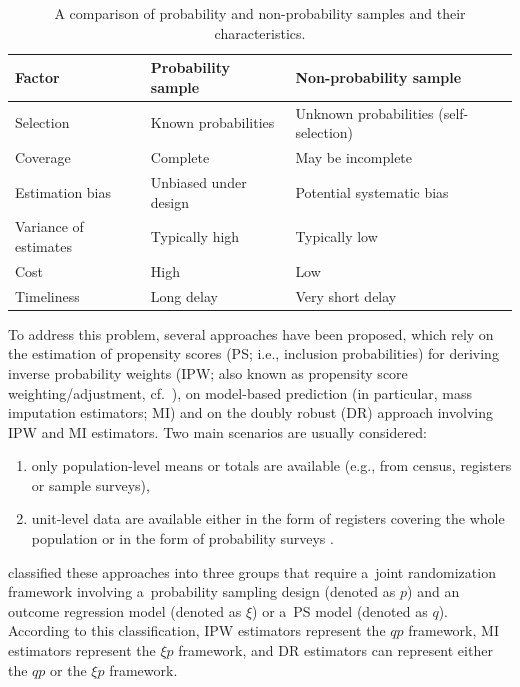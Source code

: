 \documentclass[
]{jss}
\begin{document}
\begin{table}[ht!]
    \centering
    \begin{tabular}{lll}
    \hline
    \textbf{Factor}   &  \textbf{Probability sample} & \textbf{Non-probability sample}\\
    \hline
    Selection & Known probabilities & Unknown probabilities (self-selection) \\
    Coverage & Complete & May be incomplete \\
    Estimation bias & Unbiased under design & Potential systematic bias \\
    Variance of estimates & Typically high & Typically low \\
    Cost & High & Low \\
    Timeliness & Long delay & Very short delay \\
    \hline
    \end{tabular}
    \caption{A comparison of probability and non-probability samples and their characteristics.}
    \label{tab-comparison-characteristics}
\end{table}

To address this problem, several approaches have been proposed, which
rely on the estimation of propensity scores (PS; i.e., inclusion
probabilities) for deriving inverse probability weights (IPW; also known
as propensity score weighting/adjustment,
cf.~\citet{lee2006propensity, lee2009estimation}), on model-based
prediction (in particular, mass imputation estimators; MI) and on the
doubly robust (DR) approach involving IPW and MI estimators. Two main
scenarios are usually considered:

\begin{enumerate}
\item only population-level means or totals are available (e.g., from census, registers or sample surveys), 
\item unit-level data are available either in the form of registers covering the whole population or in the form of probability surveys \citep[cf.][]{elliott_inference_2017}. 
\end{enumerate}

\citet{wu2022statistical} classified these approaches into three groups
that require a~joint randomization framework involving a~probability
sampling design (denoted as \(p\)) and an outcome regression model
(denoted as \(\xi\)) or a~PS model (denoted as \(q\)). According to this
classification, IPW estimators represent the \(qp\) framework, MI
estimators represent the \(\xi p\) framework, and DR estimators can
represent either the \(qp\) or the \(\xi p\) framework.
\end{document}
